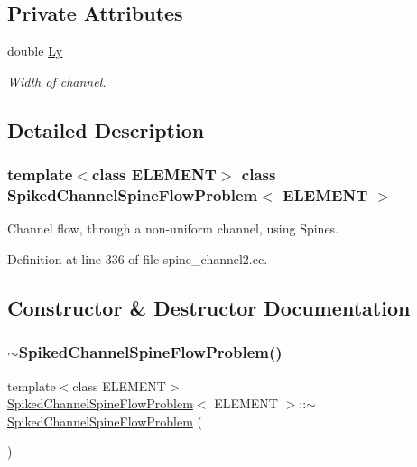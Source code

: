 \subsection*{Private Attributes}
\begin{DoxyCompactItemize}
\item 
double \hyperlink{classSpikedChannelSpineFlowProblem_abb8d6a5648396f351835d646c2731b12}{Ly}
\begin{DoxyCompactList}\small\item\em Width of channel. \end{DoxyCompactList}\end{DoxyCompactItemize}


\subsection{Detailed Description}
\subsubsection*{template$<$class E\+L\+E\+M\+E\+NT$>$\newline
class Spiked\+Channel\+Spine\+Flow\+Problem$<$ E\+L\+E\+M\+E\+N\+T $>$}

Channel flow, through a non-\/uniform channel, using Spines. 

Definition at line 336 of file spine\+\_\+channel2.\+cc.



\subsection{Constructor \& Destructor Documentation}
\mbox{\label{classSpikedChannelSpineFlowProblem_a48ee634b61ca54658104d476c683264e}} 
\subsubsection{\texorpdfstring{$\sim$\+Spiked\+Channel\+Spine\+Flow\+Problem()}{~SpikedChannelSpineFlowProblem()}}
{\footnotesize\ttfamily template$<$class E\+L\+E\+M\+E\+NT$>$ \\
\hyperlink{classSpikedChannelSpineFlowProblem}{Spiked\+Channel\+Spine\+Flow\+Problem}$<$ E\+L\+E\+M\+E\+NT $>$\+::$\sim$\hyperlink{classSpikedChannelSpineFlowProblem}{Spiked\+Channel\+Spine\+Flow\+Problem} (\begin{DoxyParamCaption}{ }\end{DoxyParamCaption})\hspace{0.3cm}{\ttfamily [inline]}}



